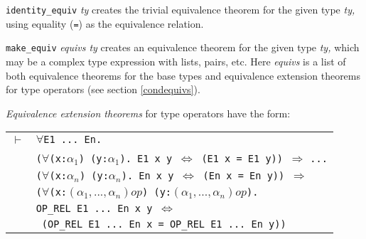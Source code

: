 \documentclass[envcountsame,runningheads]{llncs}
\begin{document}
\begin{center}
\end{center}

{\tt identity\_equiv} {\it ty\/} creates the trivial equivalence theorem for
the given type {\it ty,} using equality ({\tt =}) as the equivalence relation.

{\tt make\_equiv} {\it equivs ty\/} creates an equivalence
theorem for the given type {\it ty,}
which may be a complex type expression with lists, pairs, etc.
Here {\it equivs} is a list of both equivalence theorems
for the base types and equivalence extension theorems for type operators
(see section \ref{condequivs}).

{\it Equivalence extension theorems\/} for type operators
have the form:
\begin{center}
\begin{tabular}{rl}
$\vdash$ & {\tt $\forall$E1 ... En. }  \\
& {\tt ($\forall$(x:$\alpha_1$) (y:$\alpha_1$). E1 x y $\Leftrightarrow$ (E1 x = E1 y)) $\Rightarrow$}
 {\tt ...} \\
& {\tt ($\forall$(x:$\alpha_n$) (y:$\alpha_n$). En x y $\Leftrightarrow$ (En x = En y)) $\Rightarrow$}  \\
& {\tt ($\forall$(x:$(\alpha_1,...,\alpha_n)op$) (y:$(\alpha_1,...,\alpha_n)op$).}  \\
& \hspace{4mm}
{\tt OP\_REL E1 ... En x y $\Leftrightarrow$ }  \\
& {\tt
\hspace{5mm}
(OP\_REL E1 ... En x = OP\_REL E1 ... En y))}  \\
\end{tabular}
\end{center}
\end{document}
